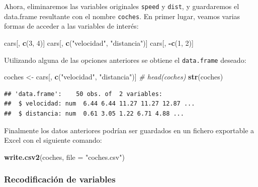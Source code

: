 \documentclass[
]{book}
\newenvironment{Shaded}{\begin{snugshade}}{\end{snugshade}}
\newcommand{\CommentTok}[1]{\textcolor[rgb]{0.56,0.35,0.01}{\textit{#1}}}
\newcommand{\DataTypeTok}[1]{\textcolor[rgb]{0.13,0.29,0.53}{#1}}
\newcommand{\DecValTok}[1]{\textcolor[rgb]{0.00,0.00,0.81}{#1}}
\newcommand{\KeywordTok}[1]{\textcolor[rgb]{0.13,0.29,0.53}{\textbf{#1}}}
\newcommand{\NormalTok}[1]{#1}
\newcommand{\OperatorTok}[1]{\textcolor[rgb]{0.81,0.36,0.00}{\textbf{#1}}}
\newcommand{\StringTok}[1]{\textcolor[rgb]{0.31,0.60,0.02}{#1}}
\begin{document}
Ahora, eliminaremos las variables originales \texttt{speed} y
\texttt{dist}, y guardaremos el data.frame resultante con el nombre \texttt{coches}.
En primer lugar, veamos varias formas de acceder a las variables de
interés:

\begin{Shaded}
\begin{Highlighting}[]
\NormalTok{cars[, }\KeywordTok{c}\NormalTok{(}\DecValTok{3}\NormalTok{, }\DecValTok{4}\NormalTok{)]}
\NormalTok{cars[, }\KeywordTok{c}\NormalTok{(}\StringTok{"velocidad"}\NormalTok{, }\StringTok{"distancia"}\NormalTok{)]}
\NormalTok{cars[, }\OperatorTok{-}\KeywordTok{c}\NormalTok{(}\DecValTok{1}\NormalTok{, }\DecValTok{2}\NormalTok{)]}
\end{Highlighting}
\end{Shaded}

Utilizando alguna de las opciones anteriores se obtiene el \texttt{data.frame}
deseado:

\begin{Shaded}
\begin{Highlighting}[]
\NormalTok{coches <-}\StringTok{ }\NormalTok{cars[, }\KeywordTok{c}\NormalTok{(}\StringTok{"velocidad"}\NormalTok{, }\StringTok{"distancia"}\NormalTok{)]}
\CommentTok{# head(coches)}
\KeywordTok{str}\NormalTok{(coches)}
\end{Highlighting}
\end{Shaded}

\begin{verbatim}
## 'data.frame':    50 obs. of  2 variables:
##  $ velocidad: num  6.44 6.44 11.27 11.27 12.87 ...
##  $ distancia: num  0.61 3.05 1.22 6.71 4.88 ...
\end{verbatim}

Finalmente los datos anteriores podrían ser guardados en un fichero
exportable a Excel con el siguiente comando:

\begin{Shaded}
\begin{Highlighting}[]
\KeywordTok{write.csv2}\NormalTok{(coches, }\DataTypeTok{file =} \StringTok{"coches.csv"}\NormalTok{)}
\end{Highlighting}
\end{Shaded}

\hypertarget{recodificaciuxf3n-de-variables}{%
\subsubsection{Recodificación de variables}\label{recodificaciuxf3n-de-variables}}
\end{document}
